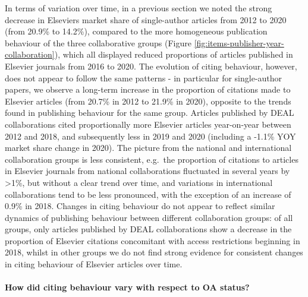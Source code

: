 \documentclass[
]{article}
\begin{document}
In terms of variation over time, in a previous section we noted the strong decrease in Elsevier\textquotesingle s market share of single-author articles from 2012 to 2020 (from 20.9\% to 14.2\%), compared to the more homogeneous publication behaviour of the three collaborative groups (Figure \ref{fig:items-publisher-year-collaboration}), which all displayed reduced proportions of articles published in Elsevier journals from 2016 to 2020. The evolution of citing behaviour, however, does not appear to follow the same patterns - in particular for single-author papers, we observe a long-term increase in the proportion of citations made to Elsevier articles (from 20.7\% in 2012 to 21.9\% in 2020), opposite to the trends found in publishing behaviour for the same group. Articles published by DEAL collaborations cited proportionally more Elsevier articles year-on-year between 2012 and 2018, and subsequently less in 2019 and 2020 (including a -1.1\% YOY market share change in 2020). The picture from the national and international collaboration groups is less consistent, e.g.~the proportion of citations to articles in Elsevier journals from national collaborations fluctuated in several years by \textgreater1\%, but without a clear trend over time, and variations in international collaborations tend to be less pronounced, with the exception of an increase of 0.9\% in 2018. Changes in citing behaviour do not appear to reflect similar dynamics of publishing behaviour between different collaboration groups: of all groups, only articles published by DEAL collaborations show a decrease in the proportion of Elsevier citations concomitant with access restrictions beginning in 2018, whilst in other groups we do not find strong evidence for consistent changes in citing behaviour of Elsevier articles over time.

\hypertarget{how-did-citing-behaviour-vary-with-respect-to-oa-status}{%
\paragraph{How did citing behaviour vary with respect to OA status?}\label{how-did-citing-behaviour-vary-with-respect-to-oa-status}}
\end{document}

